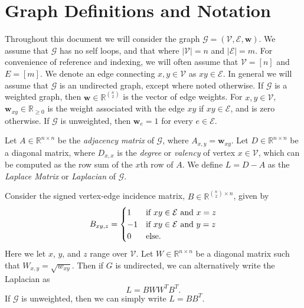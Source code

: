 \documentclass{report}
\begin{document}
\section{Graph Definitions and Notation} \label{background:sec:graphdef}

Throughout this document we will consider the graph $\mathcal{G} = (\mathcal{V}, \mathcal{E}, \mathbf{w})$.
We assume that $\mathcal{G}$ has no self loops, and that where $|\mathcal{V}| = n$ and $|\mathcal{E}| = m$.
For convenience of reference and indexing, we will often assume that $\mathcal{V} = [n]$ and $E = [m]$. 
We denote an edge connecting $x, y \in \mathcal{V}$ as $xy \in \mathcal{E}$. 
In general we will assume that $\mathcal{G}$ is an  undirected graph, except where noted otherwise. 
If $\mathcal{G}$ is a weighted graph, then $\mathbf{w} \in \mathbb{R}^{{n \choose 2}}$ is the vector of edge weights. 
For $x, y \in \mathcal{V}$, $\mathbf{w}_{xy} \in \mathbb{R}_{\geq 0}$ is the weight associated with the edge $xy$ if $xy \in \mathcal{E}$, and is zero otherwise.
If $\mathcal{G}$ is unweighted, then $\mathbf{w}_e = 1$ for every $e \in \mathcal{E}$. 

Let $A \in \mathbb{R}^{n\times n}$ be the \emph{adjacency matrix} of $\mathcal{G}$, where $A_{x,y} = \mathbf{w}_{xy}$.
Let $D \in \mathbb{R}^{n\times n}$ be a diagonal matrix, where $D_{x,x}$ is the \emph{degree} or \emph{valency} of vertex $x \in \mathcal{V}$, which can be computed as the row sum of the $x$th row of $A$. 
We define $L = D - A$ as the \emph{Laplace Matrix} or \emph{Laplacian} of $\mathcal{G}$.

Consider the signed vertex-edge incidence matrix, $B \in \mathbb{R}^{{n \choose 2} \times n}$, given by
%
\begin{equation} \label{eq:veim}
B_{xy,z} = 
\begin{cases}
1 & \textnormal{if $xy \in \mathcal{E}$ and $x=z$} \\
-1 & \textnormal{if $xy \in \mathcal{E}$ and $y=z$} \\
0 & \textnormal{else}.
\end{cases}
\end{equation}
%
Here we let $x$, $y$, and $z$ range over $\mathcal{V}$. 
Let $W \in \mathbb{R}^{n \times n}$ be a diagonal matrix such that $W_{x,y} = \sqrt{w_{xy}}$.
Then if $G$ is undirected, we can alternatively write the Laplacian as 
%
\begin{equation} \label{eq:laplacian}
L = BWW^TB^T.
\end{equation}
%
If $\mathcal{G}$ is unweighted, then we can simply write $L = BB^T$. 
\end{document}
